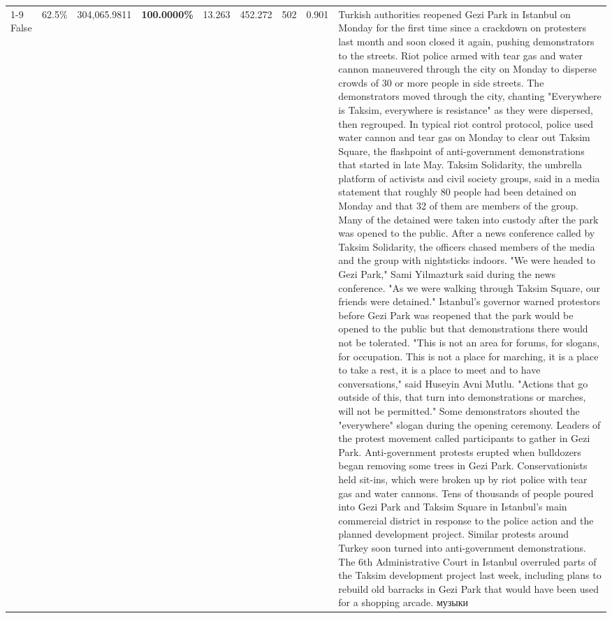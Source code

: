 \begin{table}[H]
\begin{tabular}{lllrlllll}
\cline{1-9}
False & 62.5\% & \color{red} 304,065.9811 & \bfseries \color{red} 100.0000\% & 13.263 & 452.272 & 502 & 0.901 & Turkish authorities reopened Gezi Park in Istanbul on Monday for the first time since a crackdown on protesters last month and soon closed it again, pushing demonstrators to the streets. Riot police armed with tear gas and water cannon maneuvered through the city on Monday to disperse crowds of 30 or more people in side streets. The demonstrators moved through the city, chanting "Everywhere is Taksim, everywhere is resistance" as they were dispersed, then regrouped. In typical riot control protocol, police used water cannon and tear gas on Monday to clear out Taksim Square, the flashpoint of anti-government demonstrations that started in late May. Taksim Solidarity, the umbrella platform of activists and civil society groups, said in a media statement that roughly 80 people had been detained on Monday and that 32 of them are members of the group. Many of the detained were taken into custody after the park was opened to the public. After a news conference called by Taksim Solidarity, the officers chased members of the media and the group with nightsticks indoors. "We were headed to Gezi Park," Sami Yilmazturk said during the news conference. "As we were walking through Taksim Square, our friends were detained." Istanbul's governor warned protestors before Gezi Park was reopened that the park would be opened to the public but that demonstrations there would not be tolerated. "This is not an area for forums, for slogans, for occupation. This is not a place for marching, it is a place to take a rest, it is a place to meet and to have conversations," said Huseyin Avni Mutlu. "Actions that go outside of this, that turn into demonstrations or marches, will not be permitted." Some demonstrators shouted the "everywhere" slogan during the opening ceremony. Leaders of the protest movement called participants to gather in Gezi Park. Anti-government protests erupted when bulldozers began removing some trees in Gezi Park. Conservationists held sit-ins, which were broken up by riot police with tear gas and water cannons. Tens of thousands of people poured into Gezi Park and Taksim Square in Istanbul's main commercial district in response to the police action and the planned development project. Similar protests around Turkey soon turned into anti-government demonstrations. The 6th Administrative Court in Istanbul overruled parts of the Taksim development project last week, including plans to rebuild old barracks in Gezi Park that would have been used for a shopping arcade. музыки \\

\end{tabular}
\end{table}
